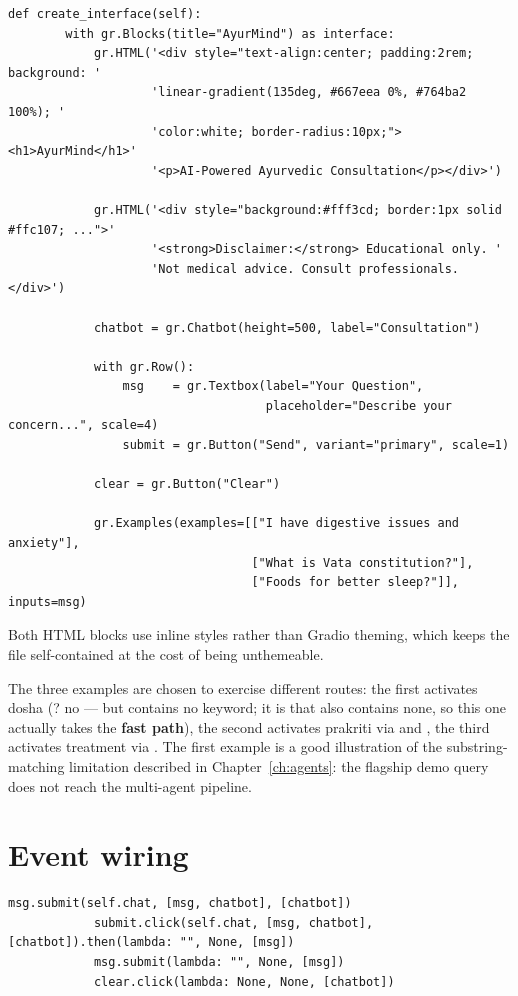 \begin{lstlisting}[style=py,firstnumber=128]
    def create_interface(self):
        with gr.Blocks(title="AyurMind") as interface:
            gr.HTML('<div style="text-align:center; padding:2rem; background: '
                    'linear-gradient(135deg, #667eea 0%, #764ba2 100%); '
                    'color:white; border-radius:10px;"><h1>AyurMind</h1>'
                    '<p>AI-Powered Ayurvedic Consultation</p></div>')

            gr.HTML('<div style="background:#fff3cd; border:1px solid #ffc107; ...">'
                    '<strong>Disclaimer:</strong> Educational only. '
                    'Not medical advice. Consult professionals.</div>')

            chatbot = gr.Chatbot(height=500, label="Consultation")

            with gr.Row():
                msg    = gr.Textbox(label="Your Question",
                                    placeholder="Describe your concern...", scale=4)
                submit = gr.Button("Send", variant="primary", scale=1)

            clear = gr.Button("Clear")

            gr.Examples(examples=[["I have digestive issues and anxiety"],
                                  ["What is Vata constitution?"],
                                  ["Foods for better sleep?"]], inputs=msg)
\end{lstlisting}

Both HTML blocks use inline styles rather than Gradio theming, which keeps the file self-contained at the cost of being unthemeable.

The three examples are chosen to exercise different routes: the first activates dosha (? no --- but  contains no keyword; it is  that also contains none, so this one actually takes the \textbf{fast path}), the second activates prakriti via  and , the third activates treatment via . The first example is a good illustration of the substring-matching limitation described in Chapter~\ref{ch:agents}: the flagship demo query does not reach the multi-agent pipeline.

\section{Event wiring}

\begin{lstlisting}[style=py,firstnumber=147]
            msg.submit(self.chat, [msg, chatbot], [chatbot])
            submit.click(self.chat, [msg, chatbot], [chatbot]).then(lambda: "", None, [msg])
            msg.submit(lambda: "", None, [msg])
            clear.click(lambda: None, None, [chatbot])
\end{lstlisting}

